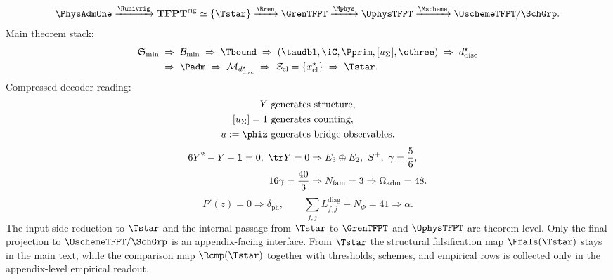 \begin{tcolorbox}[colback=tfptblue!2, colframe=tfptblue!40, breakable,
    title={Closed architecture of the paper}, colbacktitle=tfptblue!60]
\[
\PhysAdmOne
\xrightarrow{\Runivrig}
\mathbf{TFPT}^{\mathrm{rig}}
\simeq
\{\Tstar\}
\xrightarrow{\Rren}
\GrenTFPT
\xrightarrow{\Mphys}
\OphysTFPT
\xrightarrow{\Mscheme}
\OschemeTFPT/\SchGrp.
\]
Main theorem stack:
\[
\begin{aligned}
\mathfrak S_{\min}
&\;\Rightarrow\;
\mathcal B_{\min}
\;\Rightarrow\;
\Tbound
\;\Rightarrow\;
(\taudbl,\iC,\Pprim,[u_\Sigma],\cthree)
\;\Rightarrow\;
d^\star_{\mathrm{disc}}
\\
&\;\Rightarrow\;
\Padm
\;\Rightarrow\;
\mathcal M_{d^\star_{\mathrm{disc}}}
\;\Rightarrow\;
\mathcal Z_{\mathrm{cl}}=\{x^\star_{\mathrm{cl}}\}
\;\Rightarrow\;
\Tstar.
\end{aligned}
\]
Compressed decoder reading:
\[
\begin{aligned}
Y&\ \text{generates structure},\\
[u_\Sigma]=1&\ \text{generates counting},\\
u:=\phiz&\ \text{generates bridge observables}.
\end{aligned}
\]
\[
\begin{aligned}
6Y^2-Y-\mathbf 1=0,\ \tr Y=0
&\Rightarrow
E_3\oplus E_2,\ S^+,\ \gamma=\frac56,\\
16\gamma=\frac{40}{3}
&\Rightarrow
N_{\mathrm{fam}}=3
\Rightarrow
\Omega_{\mathrm{adm}}=48.
\end{aligned}
\]
\[
P'(z)=0
\Rightarrow
\delta_{\mathrm{ph}},
\qquad
\sum_{f,j}L_{f,j}^{\mathrm{diag}}+N_\Phi=41
\Rightarrow
\alpha.
\]
The input-side reduction to $\Tstar$ and the internal passage from $\Tstar$ to $\GrenTFPT$ and
$\OphysTFPT$ are theorem-level. Only the final projection to $\OschemeTFPT/\SchGrp$ is an
appendix-facing interface. From $\Tstar$ the structural falsification map $\Ffals(\Tstar)$ stays in
the main text, while the comparison map $\Rcmp(\Tstar)$ together with thresholds, schemes, and
empirical rows is collected only in the appendix-level empirical readout.
\end{tcolorbox}

